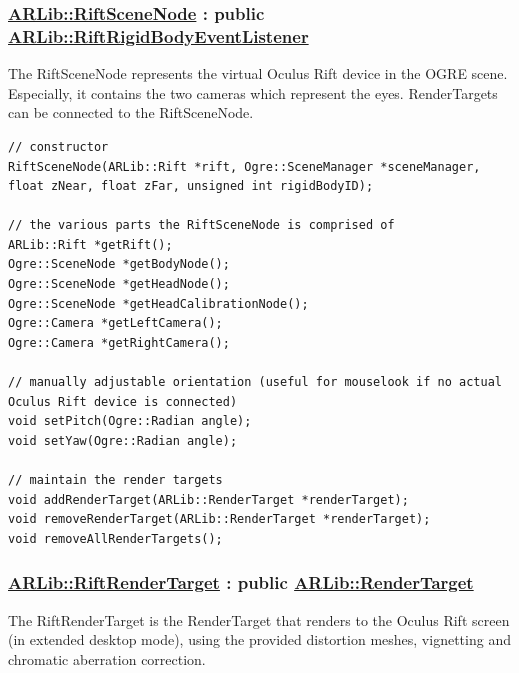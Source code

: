 \documentclass[]{article}
\begin{document}
\subsubsection{\texorpdfstring{\href{https://github.com/ands/OculusMeetsAR/blob/master/ARLib/include/ARLib/Ogre/RiftSceneNode.h}{ARLib::RiftSceneNode}
: public
\href{https://github.com/ands/OculusMeetsAR/blob/master/ARLib/include/ARLib/Tracking/RigidBodyEventListener.h\#L33}{ARLib::RiftRigidBodyEventListener}}{ARLib::RiftSceneNode : public ARLib::RiftRigidBodyEventListener}}\label{arlibriftscenenode-public-arlibriftrigidbodyeventlistener}

The RiftSceneNode represents the virtual Oculus Rift device in the OGRE
scene. Especially, it contains the two cameras which represent the eyes.
RenderTargets can be connected to the RiftSceneNode.

\begin{verbatim}
// constructor
RiftSceneNode(ARLib::Rift *rift, Ogre::SceneManager *sceneManager, float zNear, float zFar, unsigned int rigidBodyID);

// the various parts the RiftSceneNode is comprised of
ARLib::Rift *getRift();
Ogre::SceneNode *getBodyNode();
Ogre::SceneNode *getHeadNode();
Ogre::SceneNode *getHeadCalibrationNode();
Ogre::Camera *getLeftCamera();
Ogre::Camera *getRightCamera();

// manually adjustable orientation (useful for mouselook if no actual Oculus Rift device is connected)
void setPitch(Ogre::Radian angle);
void setYaw(Ogre::Radian angle);

// maintain the render targets
void addRenderTarget(ARLib::RenderTarget *renderTarget);
void removeRenderTarget(ARLib::RenderTarget *renderTarget);
void removeAllRenderTargets();
\end{verbatim}

\subsubsection{\texorpdfstring{\href{https://github.com/ands/OculusMeetsAR/blob/master/ARLib/include/ARLib/Ogre/RiftRenderTarget.h}{ARLib::RiftRenderTarget}
: public
\href{https://github.com/ands/OculusMeetsAR/blob/master/ARLib/include/ARLib/Ogre/RenderTarget.h}{ARLib::RenderTarget}}{ARLib::RiftRenderTarget : public ARLib::RenderTarget}}\label{arlibriftrendertarget-public-arlibrendertarget}

The RiftRenderTarget is the RenderTarget that renders to the Oculus Rift
screen (in extended desktop mode), using the provided distortion meshes,
vignetting and chromatic aberration correction.
\end{document}
